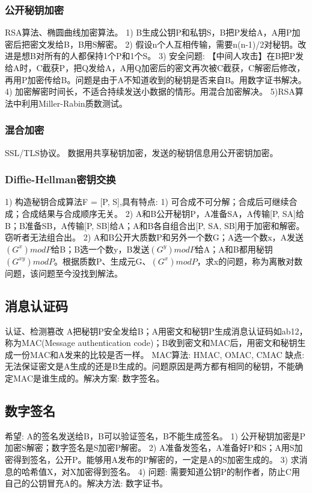 \documentclass[UTF8]{../computerUniverse}
\begin{document}
\subsubsection{公开秘钥加密}
RSA算法、椭圆曲线加密算法。
1) B生成公钥P和私钥S，B把P发给A，A用P加密后把密文发给B，B用S解密。
2) 假设n个人互相传输，需要n(n-1)/2对秘钥。改进是想B对所有的人都保持1个P和1个S。
3) 安全问题: 【中间人攻击】在B把P发给A时，C截获P，把Q发给A，A用Q加密后的密文再次被C截获，C解密后修改，再用P加密传给B。问题是由于A不知道收到的秘钥是否来自B。用数字证书解决。
4) 加密解密时间长，不适合持续发送小数据的情形。用混合加密解决。
5)RSA算法中利用Miller-Rabin质数测试。


\subsubsection{混合加密}
SSL/TLS协议。
数据用共享秘钥加密，发送的秘钥信息用公开密钥加密。


\subsubsection{Diffie-Hellman密钥交换}
1) 构造秘钥合成算法F = [P, S],具有特点: 1) 可合成不可分解；合成后可继续合成；合成结果与合成顺序无关。
2) A和B公开秘钥P，A准备SA，A传输[P, SA]给B；B准备SB，A传输[P, SB]给A；A和B各自组合出[P, SA, SB]用于加密和解密。窃听者无法组合出。
2) A和B公开大质数P和另外一个数G；A选一个数x，A发送$(G^x)modP$给B；B选一个数y，B发送$(G^y)modP$给A；A和B都用秘钥$(G^{xy})modP$。根据质数P、生成元G、$(G^x)modP$，求x的问题，称为离散对数问题，该问题至今没找到解法。



\subsection{消息认证码}
认证、检测篡改
A把秘钥P安全发给B；A用密文和秘钥P生成消息认证码如ab12，称为MAC(Message authentication code)；B收到密文和MAC后，用密文和秘钥生成一份MAC和A发来的比较是否一样。
MAC算法: HMAC, OMAC, CMAC
缺点: 无法保证密文是A生成的还是B生成的。问题原因是两方都有相同的秘钥，不能确定MAC是谁生成的。解决方案: 数字签名。


\subsection{数字签名}
希望: A的签名发送给B，B可以验证签名，B不能生成签名。
1) 公开秘钥加密是P加密S解密；数字签名是S加密P解密。
2) A准备发签名，A准备好P和S；A用S加密得到签名，公开P。能够用A发布的P解密的，一定是A的S加密生成的。
3) 求消息的哈希值X，对X加密得到签名。
4) 问题: 需要知道公钥P的制作者，防止C用自己的公钥冒充A的。解决方法: 数字证书。
\end{document}
